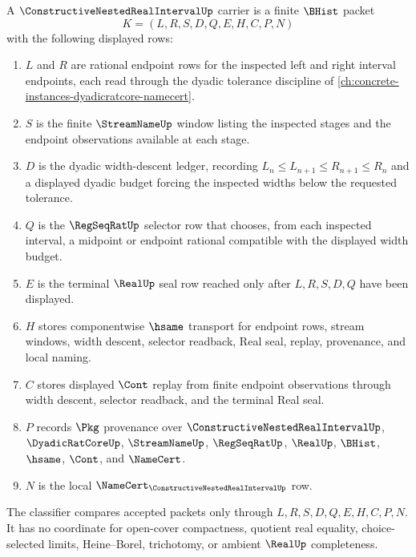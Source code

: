 \begin{definition}\label{def:constructive-nested-real-interval-carrier}
A $\ConstructiveNestedRealIntervalUp$ carrier is a finite $\BHist$ packet
$$
K=(L,R,S,D,Q,E,H,C,P,N)
$$
with the following displayed rows:
\begin{enumerate}
\item $L$ and $R$ are rational endpoint rows for the inspected left and right interval endpoints, each read through the dyadic tolerance discipline of \autoref{ch:concrete-instances-dyadicratcore-namecert}.
\item $S$ is the finite $\StreamNameUp$ window listing the inspected stages and the endpoint observations available at each stage.
\item $D$ is the dyadic width-descent ledger, recording $L_n \leq L_{n+1} \leq R_{n+1} \leq R_n$ and a displayed dyadic budget forcing the inspected widths below the requested tolerance.
\item $Q$ is the $\RegSeqRatUp$ selector row that chooses, from each inspected interval, a midpoint or endpoint rational compatible with the displayed width budget.
\item $E$ is the terminal $\RealUp$ seal row reached only after $L,R,S,D,Q$ have been displayed.
\item $H$ stores componentwise $\hsame$ transport for endpoint rows, stream windows, width descent, selector readback, Real seal, replay, provenance, and local naming.
\item $C$ stores displayed $\Cont$ replay from finite endpoint observations through width descent, selector readback, and the terminal Real seal.
\item $P$ records $\Pkg$ provenance over $\ConstructiveNestedRealIntervalUp$, $\DyadicRatCoreUp$, $\StreamNameUp$, $\RegSeqRatUp$, $\RealUp$, $\BHist$, $\hsame$, $\Cont$, and $\NameCert$.
\item $N$ is the local $\NameCert_{\ConstructiveNestedRealIntervalUp}$ row.
\end{enumerate}
The classifier compares accepted packets only through $L,R,S,D,Q,E,H,C,P,N$. It has no coordinate for open-cover compactness, quotient real equality, choice-selected limits, Heine--Borel, trichotomy, or ambient $\RealUp$ completeness.
\end{definition}

